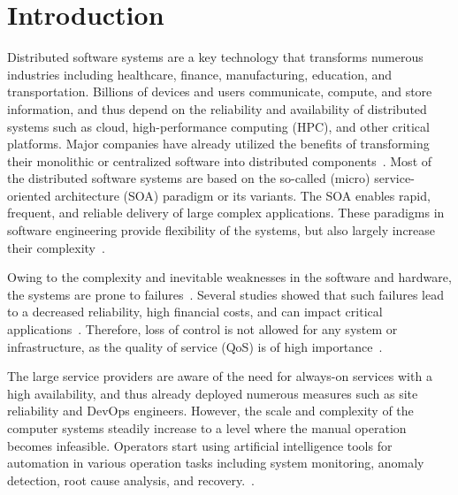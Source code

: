 \chapter{Introduction} %
\label{ch:introduction} %

Distributed software systems are a key technology that transforms numerous industries including healthcare, finance, manufacturing, education, and transportation.
Billions of devices and users communicate, compute, and store information, and thus depend on the reliability and availability of distributed systems such as cloud, high-performance computing (HPC), and other critical platforms. 
Major companies have already utilized the benefits of transforming their monolithic or centralized software into distributed components~\cite{observability2020practical}. Most of the distributed software systems are based on the so-called (micro) service-oriented architecture (SOA) paradigm or its variants. The SOA enables rapid, frequent, and reliable delivery of large complex applications. These paradigms in software engineering provide flexibility of the systems, but also largely increase their complexity~\cite{esposito2016challenges}. 

Owing to the complexity and inevitable weaknesses in the software and hardware, the systems are prone to failures~\cite{chandola2009anomaly, sultana2018survey}.
Several studies showed that such failures lead to a decreased reliability, high financial costs, and can impact critical applications~\cite{zhang2015rapid,yuan2014simple,crameri2007staged}. Therefore, loss of control is not allowed for any system or infrastructure, as the quality of service (QoS) is of high importance~\cite{nedelkoski2020loganomaly}. 

The large service providers are aware of the need for always-on services with a high availability, and thus already deployed numerous measures such as site reliability and DevOps engineers.
However, the scale and complexity of the computer systems steadily increase to a level where the manual operation becomes infeasible. Operators start using artificial intelligence tools for automation in various operation tasks including system monitoring, anomaly detection, root cause analysis, and recovery.~\cite{nedelkoski2020loganomaly,nedelkoski2020selfsupervised}. 

